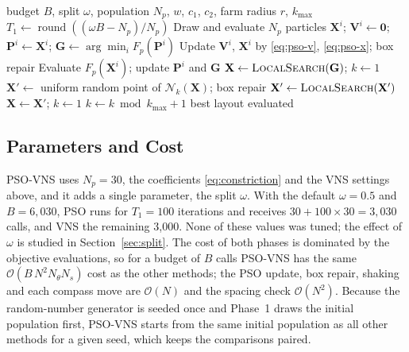 \documentclass[journal,twoside]{IEEEtran}
\begin{document}
\begin{algorithm}[!t]
\caption{PSO-VNS for a prescribed turbine count $N$}
\label{alg:hybrid}
\begin{algorithmic}[1]
\Require budget $B$, split $\omega$, population $N_p$, $w$, $c_1$, $c_2$, farm radius $r$, $k_{\max}$
\State $T_1\gets\operatorname{round}((\omega B-N_p)/N_p)$ 
\State Draw and evaluate $N_p$ particles $\mathbf X^i$; $\mathbf V^i\gets\mathbf 0$; $\mathbf P^i\gets\mathbf X^i$; $\mathbf G\gets\arg\min_i F_p(\mathbf P^i)$
        \State Update $\mathbf V^i$, $\mathbf X^i$ by \eqref{eq:pso-v}, \eqref{eq:pso-x}; box repair
        \State Evaluate $F_p(\mathbf X^i)$; update $\mathbf P^i$ and $\mathbf G$
    \EndFor
\EndFor
\State $\mathbf X\gets\textsc{LocalSearch}(\mathbf G)$; $k\gets1$ 
    \State $\mathbf X'\gets$ uniform random point of $\mathcal N_k(\mathbf X)$; box repair
    \State $\mathbf X'\gets\textsc{LocalSearch}(\mathbf X')$
        \State $\mathbf X\gets \mathbf X'$; $k\gets1$
    \Else
        \State $k\gets k\bmod k_{\max}+1$
    \EndIf
\EndWhile
\State \Return best layout evaluated
\end{algorithmic}
\end{algorithm}

\subsection{Parameters and Cost}
PSO-VNS uses $N_p=30$, the coefficients \eqref{eq:constriction} and the VNS settings above, and it adds a single parameter, the split $\omega$. With the default $\omega=0.5$ and $B=6{,}030$, PSO runs for $T_1=100$ iterations and receives $30+100\times30=3{,}030$ calls, and VNS the remaining 3,000. None of these values was tuned; the effect of $\omega$ is studied in Section~\ref{sec:split}. The cost of both phases is dominated by the objective evaluations, so for a budget of $B$ calls PSO-VNS has the same $\mathcal O(B\,N^2N_\theta N_s)$ cost as the other methods; the PSO update, box repair, shaking and each compass move are $\mathcal O(N)$ and the spacing check $\mathcal O(N^2)$. Because the random-number generator is seeded once and Phase~1 draws the initial population first, PSO-VNS starts from the same initial population as all other methods for a given seed, which keeps the comparisons paired.
\end{document}
